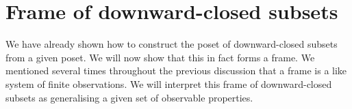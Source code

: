 
\section{Frame of downward-closed subsets}\label{sec:down-set-frame}

We have already shown how to construct the poset of downward-closed subsets from a given
poset. We will now show that this in fact forms a frame. We mentioned several times
throughout the previous discussion that a frame is a like system of finite observations.
We will interpret this frame of downward-closed subsets as generalising a given set of
observable properties.

